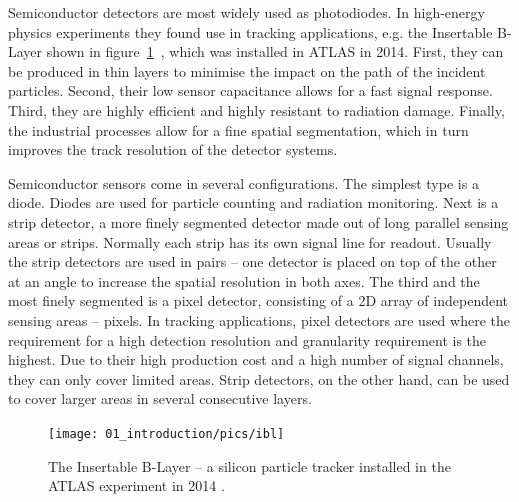 Semiconductor detectors are most widely used as photodiodes. In high-energy physics experiments they found use in tracking applications, e.g. the Insertable B-Layer shown in figure~\ref{fig:ibl}~\cite{Pernegger:1985432}, which was installed in ATLAS in 2014. First, they can be produced in thin layers to minimise the impact on the path of the incident particles. Second, their low sensor capacitance allows for a fast signal response. Third, they are highly efficient and highly resistant to radiation damage. Finally, the industrial processes allow for a fine spatial segmentation, which in turn improves the track resolution of the detector systems. 

Semiconductor sensors come in several configurations. The simplest type is a diode. Diodes are used for particle counting and radiation monitoring. Next is a strip detector, a more finely segmented detector made out of long parallel sensing areas or strips. Normally each strip has its own signal line for readout. Usually the strip detectors are used in pairs -- one detector is placed on top of the other at an angle to increase the spatial resolution in both axes. The third and the most finely segmented is a pixel detector, consisting of a 2D array of independent sensing areas -- pixels. In tracking applications, pixel detectors are used where the requirement for a high detection resolution and granularity requirement is the highest. Due to their high production cost and a high number of signal channels, they can only cover limited areas. Strip detectors, on the other hand, can be used to cover larger areas in several consecutive layers.

\begin{figure}[!t]
\centering
\texttt{[image: 01\_introduction/pics/ibl]}
\caption{The Insertable B-Layer -- a silicon particle tracker installed in the ATLAS experiment in 2014 \cite{MarcelloniDeOliveira:1702006}.}
\label{fig:ibl}
\end{figure}




